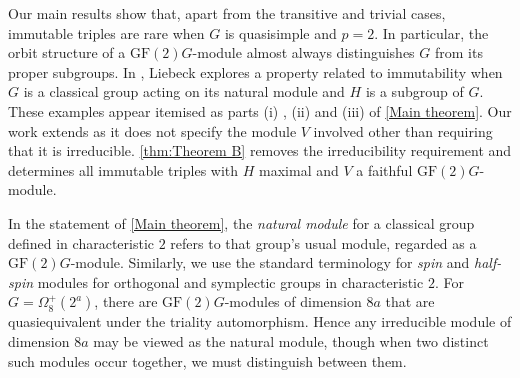 \documentclass[12pt]{amsart}
\theoremstyle{remark}
\theoremstyle{notation}
\theoremstyle{definition}
\newcommand{\GF}{\mathrm{GF}}
\newcommand{\0}{\emptyset}
\begin{document}
Our main results show that, apart from the transitive and trivial cases, immutable triples are rare when $G$ is quasisimple and $p=2$. In particular, the orbit structure of a $\GF(2)G$-module almost always distinguishes $G$ from its proper subgroups.  In \cite{Liebeck}, Liebeck explores a property related to immutability  when $G$ is a classical group acting on its natural module and $H$ is a subgroup of $G$. These examples appear itemised as parts (i) , (ii) and (iii) of \cref{Main theorem}. Our work extends \cite[Theorem]{Liebeck} as it does not specify the module $V$ involved other than requiring that it is irreducible.  \cref{thm:Theorem B} removes the irreducibility requirement and determines all immutable triples with $H$ maximal and $V$ a faithful $\GF(2)G$-module.

In the statement of \cref{Main theorem}, the \emph{natural module} for a classical group defined in characteristic $ 2 $ refers to that group’s usual module, regarded as a $ \GF(2)G $-module.
Similarly, we use the standard terminology for \emph{spin} and \emph{half-spin} modules for orthogonal and symplectic groups in characteristic $ 2 $.
For $G= \Omega_8^+(2^a) $, there are $ \GF(2)G $-modules of dimension $ 8a $ that are quasiequivalent under the triality automorphism. Hence any irreducible module of dimension $ 8a $ may be viewed as the natural module, though when two distinct such modules occur together, we must distinguish between them.
\end{document}

